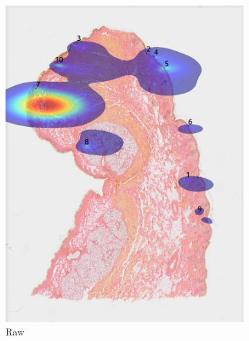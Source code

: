 \documentclass[a4paper,11pt]{report}
\numberwithin{figure}{section} %
\begin{document}
\begin{itemize}
        \begin{figure}[H]
            \centering
            \begin{subfigure}[b]{0.19\textwidth}
            \includegraphics[width=\textwidth]{images/5501147_heatmap_basic.png}
            \caption{Raw}
            \end{subfigure}
            \begin{subfigure}[b]{0.19\textwidth}

\end{subfigure}
\end{figure}
\end{itemize}
\end{document}
